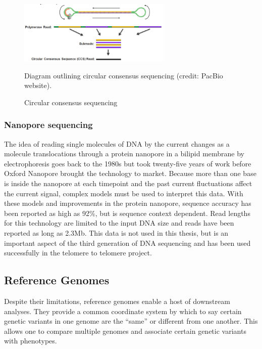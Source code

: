\begin{figure}[htbp!]
\caption{Circular consensus sequencing}
\label{figure:ccs}
\begin{centering}
\includegraphics[width=0.65\textwidth]{CCS.png}
\par{Diagram outlining circular consensus sequencing (credit: PacBio website).}
\end{centering}
\end{figure}

\subsubsection{Nanopore sequencing}

\par{
The idea of reading single molecules of DNA by the current changes as a molecule translocations through a protein nanopore in a bilipid membrane by electrophoresis goes back to the 1980s\cite{nanopore1} but took twenty-five years of work before Oxford Nanopore brought the technology to market\cite{nanopore2}\cite{nanopore3}. Because more than one base is inside the nanopore at each timepoint and the past current fluctuations affect the current signal, complex models must be used to interpret this data\cite{nanocall}\cite{deepnano}. With these models and improvements in the protein nanopore, sequence accuracy has been reported as high as 92\%, but is sequence context dependent. Read lengths for this technology are limited to the input DNA size and reads have been reported as long as 2.3Mb\cite{longlong}\cite{ultralong2}. This data is not used in this thesis, but is an important aspect of the third generation of DNA sequencing and has been used successfully in the telomere to telomere project\cite{T2T2}.
}

\subsection{Reference Genomes}

\par{
Despite their limitations, reference genomes enable a host of downstream analyses. They provide a common coordinate system by which to say certain genetic variants in one genome are the ``same'' or different from one another. This allows one to compare multiple genomes and associate certain genetic variants with phenotypes.
}

